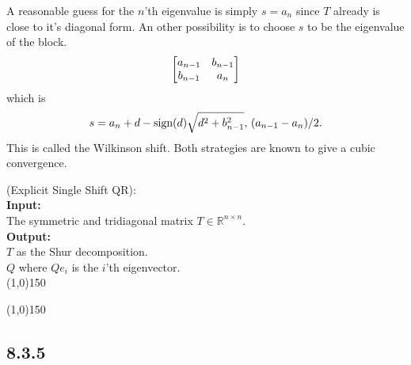 A reasonable guess for the $n$'th eigenvalue is simply $s=a_n$ since $T$ already is close to it's
diagonal form. An other possibility is to choose $s$ to be the eigenvalue of the block.
\begin{equation}
	\left[\begin{matrix} a_{n-1}&b_{n-1}\\b_{n-1}&a_n \end{matrix}\right]
\end{equation}  
which is 
\begin{equation}
	s=a_n+d-\text{sign}{}(d)\sqrt{d^2+b_{n-1}^2},\,(a_{n-1}-a_n)/2.
\end{equation}
This is called the Wilkinson shift.
%
Both strategies are known to give a cubic convergence.
%
%
\begin{algo}
{
%
	(Explicit Single Shift QR):
%
}\\
\textbf{Input: }
{
%
	\\The symmetric and tridiagonal matrix $T\in\mathbb R^{n\times n}$.
%
}\\
\textbf{Output: }
{
%
	\\$T$ as the Shur decomposition.
	\\$Q$ where $Qe_i$ is the $i$'th eigenvector.
%
}\\
\line(1,0){150}
\begin{algorithmic}
%
\EndFor{}
%
\end{algorithmic}
\label{algQRSingleShiflExplicit}
\line(1,0){150}
\end{algo}
%



\subsection*{8.3.5 }%

